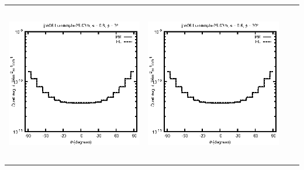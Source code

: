 \begin{tabular}{c c c c}
\includegraphics[height=7cm]{../eps/jok06_Lu_sample_25.00m_fwd.eps} &
\includegraphics[height=7cm]{../eps/jok06_Lu_sample_25.00m_cross.eps} \\
\end{tabular}

\pagebreak

